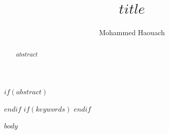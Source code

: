 \documentclass[aps,prd,twocolumn,amsmath,amssymb,superscriptaddress,nofootinbib,floatfix]{revtex4-2}
\begin{document}
\title{$title$}
\author{Mohammed Haouach}
$if(abstract)$
\begin{abstract}
$abstract$
\end{abstract}
$endif$
$if(keywords)$
$endif$
\maketitle
$body$
\end{document}
